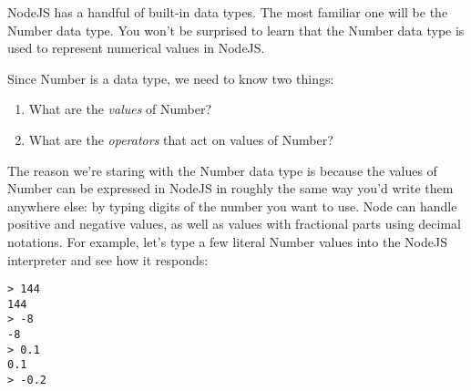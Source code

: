 NodeJS has a handful of built-in data types. The most familiar one will be the \textsf{Number} data type. You won't be surprised to learn that the \textsf{Number} data type is used to represent numerical values in NodeJS.

Since \textsf{Number} is a data type, we need to know two things:
\begin{enumerate}
  \item What are the \emph{values} of \textsf{Number}?
  \item What are the \emph{operators} that act on values of \textsf{Number}?
\end{enumerate}

The reason we're staring with the \textsf{Number} data type is because the values of \textsf{Number} can be expressed in NodeJS in roughly the same way you'd write them anywhere else: by typing digits of the number you want to use. Node can handle positive and negative values, as well as values with fractional parts using decimal notations. For example, let's type a few literal \textsf{Number} values into the NodeJS interpreter and see how it responds:


\suppresslinenumbers
\begin{lstlisting}
> 144
144
> -8
-8
> 0.1
0.1
> -0.2
\end{lstlisting}
\reactivatelinenumbers



